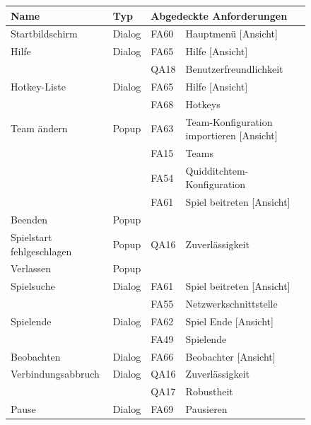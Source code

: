 \begin{figure}[H]
    \centering
    \begin{tabular}{|p{} p{} p{} p{}|}
        \hline
        \textbf{Name} & \textbf{Typ} & \multicolumn{2}{l|}{\textbf{Abgedeckte Anforderungen}} \\\hline
        Startbildschirm & Dialog & FA60 & Hauptmenü [Ansicht]\\\hline
        Hilfe & Dialog & FA65 & Hilfe [Ansicht]\\
        & & QA18 & Benutzerfreundlichkeit\\\hline
        Hotkey-Liste & Dialog & FA65 & Hilfe [Ansicht]\\
        & & FA68 & Hotkeys\\\hline
        Team ändern & Popup & FA63 & Team-Konfiguration importieren [Ansicht]\\
        & & FA15 & Teams\\
        & & FA54 & Quidditchtem-Konfiguration\\
        & & FA61 & Spiel beitreten [Ansicht]\\\hline
        Beenden & Popup & & \\\hline
        Spielstart fehlgeschlagen & Popup & QA16 & Zuverlässigkeit\\\hline
        Verlassen & Popup & &\\\hline
        Spielsuche & Dialog & FA61 & Spiel beitreten [Ansicht]\\
        & & FA55 & Netzwerkschnittstelle\\\hline
        Spielende & Dialog & FA62 & Spiel Ende [Ansicht]\\
        & & FA49 & Spielende\\\hline
        Beobachten & Dialog & FA66 & Beobachter [Ansicht]\\\hline
        Verbindungsabbruch & Dialog & QA16 & Zuverlässigkeit\\
        & & QA17 & Robustheit\\\hline
        Pause & Dialog & FA69 & Pausieren\\\hline
    \end{tabular}
\end{figure}
